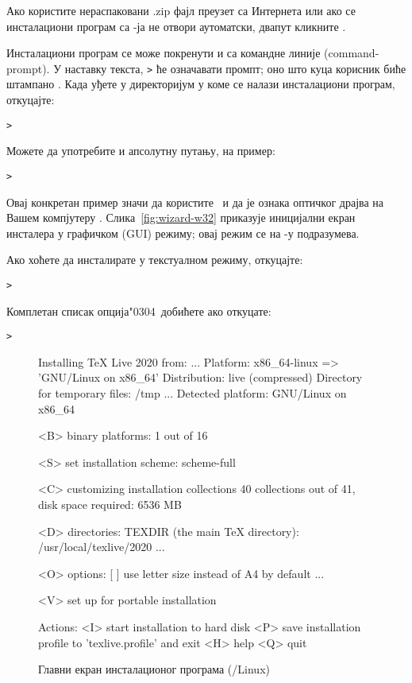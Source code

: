 \documentclass{article}
\begin{document}
Ако користите нераспаковани .zip фајл преузет са Интернета или ако се
инсталациони програм са \DVD-ја не отвори аутоматски, двапут кликните
.

Инсталациони програм се може покренути и са командне линије
(command-prompt). У наставку текста, \texttt{>} ће означавати промпт;
оно што куца корисник биће штампано  .
Када уђете у директоријум у коме се налази инсталациони програм,
откуцајте:
\begin{alltt}> 
\end{alltt}

Можете да употребите и апсолутну путању, на пример:
\begin{alltt}> 
\end{alltt}
Овај конкретан пример значи да користите \TK\ \DVD и да је ознака
оптичког драјва на Вашем компјутеру .
Слика~\ref{fig:wizard-w32} приказује иницијални екран инсталера
у графичком (GUI) режиму; овај режим се на \Windows{}-у подразумева.

Ако хоћете да инсталирате у текстуалном режиму, откуцајте:
\begin{alltt}> 
\end{alltt}

Комплетан списак опција\char"0304\ добићете ако откуцате:
\begin{alltt}> 
\end{alltt}

\begin{figure}[tb]
\begin{boxedverbatim}
Installing TeX Live 2020 from: ...
Platform: x86_64-linux => 'GNU/Linux on x86_64'
Distribution: live (compressed)
Directory for temporary files: /tmp
...
 Detected platform: GNU/Linux on x86_64

 <B> binary platforms: 1 out of 16

 <S> set installation scheme: scheme-full

 <C> customizing installation collections
   40 collections out of 41, disk space required: 6536 MB

 <D> directories:
   TEXDIR (the main TeX directory):
     /usr/local/texlive/2020
   ...

 <O> options:
   [ ] use letter size instead of A4 by default
   ...

   <V> set up for portable installation

Actions:
 <I> start installation to hard disk
 <P> save installation profile to 'texlive.profile' and exit
 <H> help
 <Q> quit
\end{boxedverbatim}
\caption{Главни екран инсталационог програма (\GNU/Linux)}\label{fig:text-main}
\end{figure}
\end{document}
